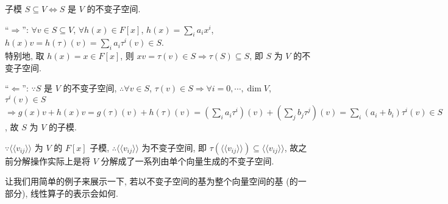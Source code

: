 \documentclass{note}
\begin{document}
\begin{thm}[(课本定理 7.5)]
    子模 $S\subseteq V\Longleftrightarrow S$ 是 $V$ 的不变子空间.
\end{thm}
\begin{pf}
    ``$\Longrightarrow$'': $\forall v\in S\subseteq V$, $\forall h(x)\in F[x]$, $h(x)=\sum_ia_ix^i$, $h(x)v=h(\tau)(v)=\sum_ia_i\tau^i(v)\in S$.\\
    特别地, 取 $h(x)=x\in F[x]$, 则 $xv=\tau(v)\in S\Longrightarrow\tau(S)\subseteq S$, 即 $S$ 为 $V$ 的不变子空间.

    ``$\Longleftarrow$'': $\because S$ 是 $V$ 的不变子空间, $\therefore\forall v\in S$, $\tau(v)\in S\Longrightarrow\forall i=0,\cdots,\dim V$, $\tau^i(v)\in S$\\
    $\Longrightarrow g(x)v+h(x)v=g(\tau)(v)+h(\tau)(v)=\left(\sum_ia_i\tau^i\right)(v)+\left(\sum_jb_j\tau^j\right)(v)=\sum_i(a_i+b_i)\tau^i(v)\in S$, 故 $S$ 为 $V$ 的子模.
\end{pf}

$\because\langle\langle v_{ij}\rangle\rangle$ 为 $V$ 的 $F[x]$ 子模, $\therefore\langle\langle v_{ij}\rangle\rangle$ 为不变子空间, 即 $\tau(\langle\langle v_{ij}\rangle\rangle)\subseteq\langle\langle v_{ij}\rangle\rangle$, 故之前分解操作实际上是将 $V$ 分解成了一系列由单个向量生成的不变子空间.

让我们用简单的例子来展示一下, 若以不变子空间的基为整个向量空间的基 (的一部分), 线性算子的表示会如何.
\end{document}
